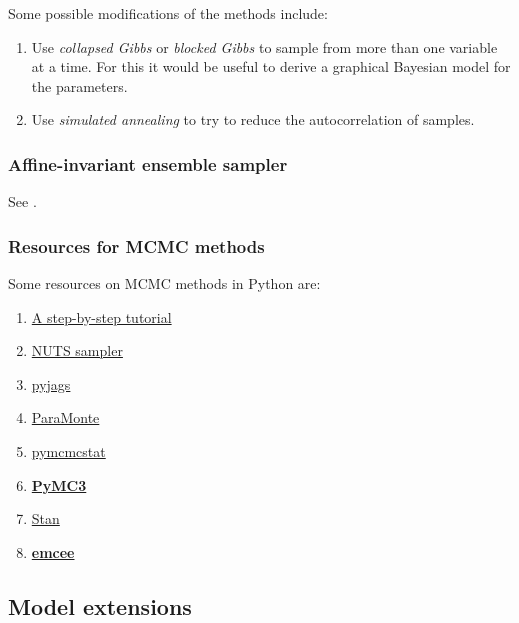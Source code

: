 \documentclass[
  a4paper,
	fontsize=11pt, %
	twoside=false, %
  secnumdepth=2,
	numbers=noenddot, %
]{kaohandt}
\begin{document}
Some possible modifications of the methods include:

\begin{enumerate}
  \item Use \textit{collapsed Gibbs} or \textit{blocked Gibbs} to sample from more than one variable at a time. For this it would be useful to derive a graphical Bayesian model for the parameters.
  \item Use \textit{simulated annealing} to try to reduce the autocorrelation of samples.

\end{enumerate}

\subsubsection{Affine-invariant ensemble sampler}

See .

\subsubsection{Resources for MCMC methods}

Some resources on MCMC methods in Python are:

\begin{enumerate}
  \item \href{https://www.tweag.io/blog/2019-10-25-mcmc-intro1/}{A step-by-step tutorial}
  \item \href{http://www.stat.columbia.edu/~gelman/research/published/nuts.pdf}{NUTS sampler}
  \item \href{https://github.com/michaelnowotny/pyjags}{pyjags}
  \item \href{https://www.cdslab.org/paramonte/index.html}{ParaMonte}
  \item \href{https://github.com/prmiles/pymcmcstat}{pymcmcstat}
  \item \href{https://docs.pymc.io/}{\textbf{PyMC3}}
  \item \href{https://mc-stan.org/}{Stan}
  \item \href{https://emcee.readthedocs.io/en/stable/tutorials/quickstart/#quickstart}{\textbf{emcee}}
\end{enumerate}

\subsection{Model extensions}
\end{document}
